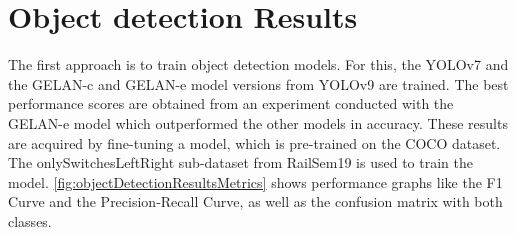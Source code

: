 \section{Object detection Results}

The first approach is to train object detection models.
For this, the \ac{YOLO}v7 and the \ac{GELAN}-c and \ac{GELAN}-e model versions from \ac{YOLO}v9 are trained.
The best performance scores are obtained from an experiment conducted with the \ac{GELAN}-e model which outperformed the other models in accuracy.
These results are acquired by fine-tuning a model, which is pre-trained on the COCO dataset.
The onlySwitchesLeftRight sub-dataset from RailSem19 is used to train the model.
\autoref{fig:objectDetectionResultsMetrics} shows performance graphs like the F1 Curve and the Precision-Recall Curve, as well as the confusion matrix with both classes.

